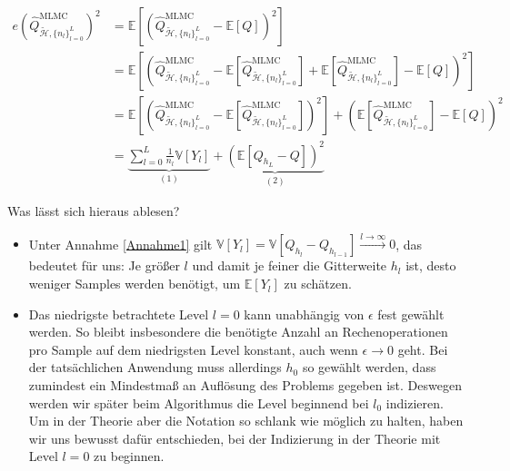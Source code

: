 \begin{align}
e(\widehat{Q}_{\tilde{\mathcal{H}},\{ n_l \}_{l=0}^L }^{\text{MLMC}})^2 &= \mathbb{E}  \left[ (\widehat{Q}_{\tilde{\mathcal{H}},\{ n_l \}_{l=0}^L }^{\text{MLMC}}- \mathbb{E}[Q])^2 \right] \nonumber \\
&= \mathbb{E}  \left[ (\widehat{Q}_{\tilde{\mathcal{H}},\{ n_l \}_{l=0}^L }^{\text{MLMC}} - \mathbb{E}[\widehat{Q}_{\tilde{\mathcal{H}},\{ n_l \}_{l=0}^L }^{\text{MLMC}}]+\mathbb{E}[\widehat{Q}_{\tilde{\mathcal{H}},\{ n_l \}_{l=0}^L }^{\text{MLMC}}]- \mathbb{E}[Q])^2 \right] \nonumber \\
&= \mathbb{E} \left[  (\widehat{Q}_{\tilde{\mathcal{H}},\{ n_l \}_{l=0}^L }^{\text{MLMC}}-\mathbb{E}[\widehat{Q}_{\tilde{\mathcal{H}},\{ n_l \}_{l=0}^L }^{\text{MLMC}}])^2 \right] +  \left(  \mathbb{E}[\widehat{Q}_{\tilde{\mathcal{H}},\{ n_l \}_{l=0}^L }^{\text{MLMC}}] - \mathbb{E}[Q] \right)^2 \nonumber \\
&= \underbrace{\sum_{l=0}^L \frac{1}{n_l} \mathbb{V}[Y_l]}_{(1)} + \underbrace{\left( \mathbb{E}[Q_{h_L}-Q] \right)^2}_{(2)}
\end{align}
\begin{Bemerkung}Was lässt sich hieraus ablesen?
	\begin{itemize}
		\item Unter Annahme \ref{Annahme1} gilt $ \mathbb{V}[Y_l] = \mathbb{V}[Q_{h_l}-Q_{h_{l-1}}] \stackrel{l \to \infty}{\to} 0  $, das bedeutet für uns: Je größer $ l $ und damit je feiner die Gitterweite $ h_l $ ist, desto weniger Samples werden benötigt, um $ \mathbb{E}[Y_l] $ zu schätzen.
		\item Das niedrigste betrachtete Level $ l = 0 $ kann unabhängig von $ \epsilon $ fest gewählt werden. So bleibt insbesondere die benötigte Anzahl an Rechenoperationen pro Sample auf dem niedrigsten Level konstant, auch wenn $ \epsilon \to 0 $ geht. Bei der tatsächlichen Anwendung muss allerdings $ h_0 $ so gewählt werden, dass zumindest ein Mindestmaß an Auflösung des Problems gegeben ist. Deswegen werden wir später beim Algorithmus die Level beginnend bei $ l_0 $ indizieren. Um in der Theorie aber die Notation so schlank wie möglich zu halten, haben wir uns bewusst dafür entschieden, bei der Indizierung in der Theorie mit Level $ l=0 $ zu beginnen.
	\end{itemize}
\end{Bemerkung} 
